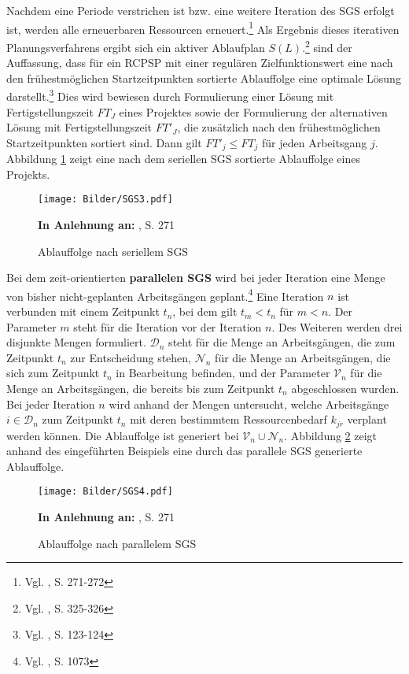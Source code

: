 \documentclass[a4paper,12pt,normalheadings,footexclude,headinclude,liststotoc,nochapterprefix,onecolumn,oneside,parskip,pointlessnumbers]{scrreprt}
\begin{document}
Nachdem eine Periode verstrichen ist bzw. eine weitere Iteration des SGS erfolgt ist, werden alle erneuerbaren Ressourcen erneuert.\footnote{Vgl. \cite{bouleimen2003new}, S. 271-272} Als Ergebnis dieses iterativen Planungsverfahrens ergibt sich ein aktiver Ablaufplan $S(L)$.\footnote{Vgl. \cite{kolisch1996serial}, S. 325-326} \cite{brucker2006complex} sind der Auffassung, dass für ein RCPSP mit einer regulären Zielfunktionswert eine nach den frühestmöglichen Startzeitpunkten sortierte Ablauffolge eine optimale Lösung darstellt.\footnote{Vgl. \cite{brucker2006complex}, S. 123-124\label{heida}} Dies wird bewiesen durch Formulierung einer Lösung mit Fertigstellungszeit $FT_{J}$ eines Projektes %
sowie der Formulierung der alternativen Lösung mit Fertigstellungszeit $FT'_{J}$, die zusätzlich nach den frühestmöglichen Startzeitpunkten sortiert sind. Dann gilt $FT'_{j} \leq FT_{j}$ für jeden Arbeitsgang $j$. Abbildung \ref{umsortiert2} zeigt eine nach dem seriellen SGS sortierte Ablauffolge eines Projekts.\\

\begin{figure}[h!]
  \begin{center}
\texttt{[image: Bilder/SGS3.pdf]}
 \caption{Ablauffolge nach seriellem SGS}\label{umsortiert2}
   {\footnotesize  \textbf{In Anlehnung an:} \cite{bouleimen2003new}, S. 271}
  \end{center}
\end{figure}

Bei dem zeit-orientierten \textbf{parallelen SGS} wird bei jeder Iteration eine Menge von bisher nicht-geplanten Arbeitsgängen geplant.\footnote{Vgl. \cite{tormos2003efficient}, S. 1073} Eine Iteration $n$ ist verbunden mit einem Zeitpunkt $t_{n}$, bei dem gilt $t_{m}<t_{n}$ für $m<n$. Der Parameter $m$ steht für die Iteration vor der Iteration $n$. Des Weiteren werden drei disjunkte Mengen formuliert. $\mathcal{D}_{n}$ steht für die Menge an Arbeitsgängen, die zum Zeitpunkt $t_{n}$ zur Entscheidung stehen, $\mathcal{N}_{n}$ für die Menge an Arbeitsgängen, die sich zum Zeitpunkt $t_{n}$ in Bearbeitung befinden, und der Parameter $\mathcal{V}_{n}$ für die Menge an Arbeitsgängen, die bereits bis zum Zeitpunkt $t_{n}$ abgeschlossen wurden. Bei jeder Iteration $n$ wird anhand der Mengen untersucht, welche Arbeitsgänge $i \in\mathcal{D}_{n}$ zum Zeitpunkt $t_{n}$ mit deren bestimmtem Ressourcenbedarf $k_{jr}$ verplant werden können. Die Ablauffolge ist generiert bei $\mathcal{V}_{n}\cup\mathcal{N}_{n}$. Abbildung \ref{umsortiert3} zeigt anhand des eingeführten Beispiels eine durch das parallele SGS generierte Ablauffolge.
\begin{figure}[h!]
  \begin{center}
\texttt{[image: Bilder/SGS4.pdf]}
 \caption{Ablauffolge nach parallelem SGS}\label{umsortiert3}
   {\footnotesize  \textbf{In Anlehnung an:} \cite{bouleimen2003new}, S. 271}
  \end{center}
\end{figure}
\end{document}
